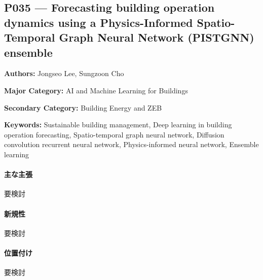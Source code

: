 \subsection{P035 --- Forecasting building operation dynamics using a Physics-Informed Spatio-Temporal Graph Neural Network (PISTGNN) ensemble}
\label{paper:P035}
\textbf{Authors:} Jongseo Lee, Sungzoon Cho\par
\textbf{Major Category:} AI and Machine Learning for Buildings\par
\textbf{Secondary Category:} Building Energy and ZEB\par
\textbf{Keywords:} Sustainable building management, Deep learning in building operation forecasting, Spatio-temporal graph neural network, Diffusion convolution recurrent neural network, Physics-informed neural network, Ensemble learning\par
\paragraph{主な主張}
要検討 \cite{Lee:2025PISTGNN}
\paragraph{新規性}
要検討
\paragraph{位置付け}
要検討
